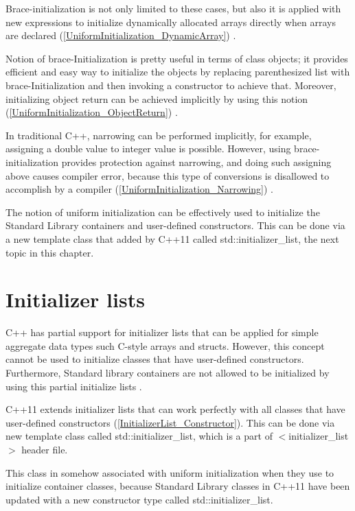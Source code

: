 \documentclass[11pt]{report}
\begin{document}
Brace-initialization is not only limited to these cases, but also it is applied with new expressions to initialize dynamically allocated arrays directly when arrays are declared (\ref{UniformInitialization_DynamicArray}) \cite{Reddy:2011:API}.

Notion of brace-Initialization is pretty useful in terms of class objects; it provides efficient and easy way to initialize the objects by replacing parenthesized list with brace-Initialization and then invoking a constructor to achieve that. Moreover, initializing object return can be achieved implicitly by using this notion (\ref{UniformInitialization_ObjectReturn}) \cite{Gregorie:professionalcpp}.


In traditional C++, narrowing can be performed implicitly, for example, assigning a double value to integer value is possible. However, using brace- initialization provides protection against narrowing, and doing such assigning above causes compiler error, because this type of conversions is disallowed to accomplish by a compiler (\ref{UniformInitialization_Narrowing}) \cite{Gregorie:professionalcpp}.


The notion of uniform initialization can be effectively used to initialize the Standard Library containers and user-defined constructors. This can be done via a new template class that added by C++11 called std::initializer\_list, the next topic in this chapter.


\section{Initializer lists}
\label{section: Initializer lists}
C++ has partial support for initializer lists that can be applied for simple aggregate data types such C-style arrays and structs. However, this concept cannot be used to initialize classes that have user-defined constructors. Furthermore, Standard library containers are not allowed to be initialized by using this partial initialize lists \cite{Reddy:2011:API}.


C++11 extends initializer lists that can work perfectly with all classes that have user-defined constructors (\ref{InitializerList_Constructor}). This can be done via new template class called std::initializer\_list, which is a part of $<$initializer\_list$>$ header file.


This class in somehow associated with uniform initialization when they use to initialize container classes, because Standard Library classes in C++11 have been updated with a new constructor type called std::initializer\_list.
\end{document}
